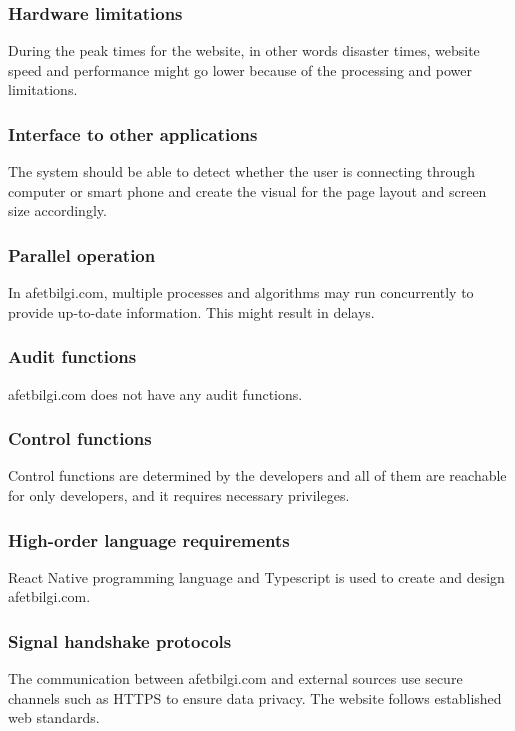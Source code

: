\documentclass[12pt]{report}
\begin{document}
\subsubsection{Hardware limitations}
During the peak times for the website, in other words disaster times, website speed and performance might go lower because of the processing and power limitations.

\subsubsection{Interface to other applications}
The system should be able to detect whether the user is connecting through computer or smart phone and create the visual for the page layout and screen size accordingly.

\subsubsection{Parallel operation} 
In afetbilgi.com, multiple processes and algorithms may run concurrently to provide up-to-date information. This might result in delays.

\subsubsection{Audit functions} 
afetbilgi.com does not have any audit functions.

\subsubsection{Control functions}
Control functions are determined by the developers and all of them are reachable for only developers, and it requires necessary privileges.

\subsubsection{High-order language requirements} 
React Native programming language and Typescript is used to create and design afetbilgi.com.

\subsubsection{Signal handshake protocols}
The communication between afetbilgi.com and external sources use secure channels such as HTTPS to ensure data privacy. The website follows established web standards.
\end{document}
